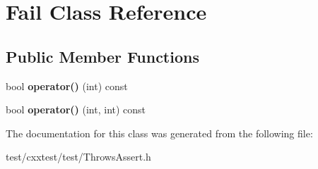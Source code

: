 \hypertarget{classFail}{\section{Fail Class Reference}
\label{classFail}
}
\subsection*{Public Member Functions}
\begin{DoxyCompactItemize}
\item 
\hypertarget{classFail_a3ae082e03b5162d873be2790158a98f2}{bool {\bfseries operator()} (int) const }\label{classFail_a3ae082e03b5162d873be2790158a98f2}

\item 
\hypertarget{classFail_ab58704cea84a6eda24d55eea573e6679}{bool {\bfseries operator()} (int, int) const }\label{classFail_ab58704cea84a6eda24d55eea573e6679}

\end{DoxyCompactItemize}


The documentation for this class was generated from the following file\-:\begin{DoxyCompactItemize}
\item 
test/cxxtest/test/Throws\-Assert.\-h\end{DoxyCompactItemize}
